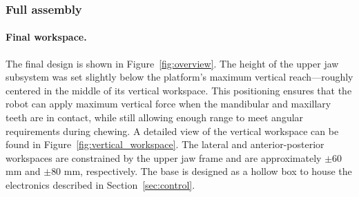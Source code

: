 \subsubsection{Full assembly}

\paragraph{Final workspace.}The final design is shown in Figure~\ref{fig:overview}. The height of the upper jaw subsystem was set slightly below the platform's maximum 
vertical reach—roughly centered in the middle of its vertical workspace. This positioning ensures that the robot can apply maximum vertical 
force when the mandibular and maxillary teeth are in contact, while still allowing enough range to meet angular requirements during chewing. 
A detailed view of the vertical workspace can be found in Figure~\ref{fig:vertical_workspace}. The lateral and anterior-posterior workspaces are 
constrained by the upper jaw frame and are approximately $\pm$60 mm and $\pm$80 mm, respectively. 
The base is designed as a hollow box to house the electronics 
described in Section~\ref{sec:control}. 

